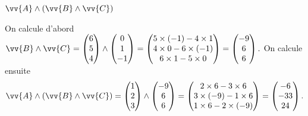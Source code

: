 


\begin{enonce}
$\vv{A}\wedge(\vv{B}\wedge\vv{C})$
\end{enonce}


\begin{corrige}
    On calcule d'abord
	$
    \vv{B}\wedge\vv{C} = 
	\begin{pmatrix}
		6 \\ 5 \\ 4
	\end{pmatrix}\wedge
	\begin{pmatrix}
		0 \\ 1 \\ -1
	\end{pmatrix}
	=
	\begin{pmatrix}
		5\times(-1) - 4\times1 \\
		4\times0 - 6\times(-1)	\\
		6\times1 - 5\times0
	\end{pmatrix}
	=
	\begin{pmatrix}
		-9 \\ 6 \\ 6
	\end{pmatrix}.
	$ 
	On calcule ensuite
    \[
    \vv{A}\wedge(\vv{B}\wedge\vv{C}) =
    \begin{pmatrix}
        1 \\ 2 \\ 3
    \end{pmatrix} \wedge
    \begin{pmatrix}
        -9 \\ 6 \\ 6
    \end{pmatrix}
    = 
	\begin{pmatrix}
		2\times6 - 3\times6 \\
		3\times(-9) - 1\times6\\
		1\times6 - 2\times(-9)
	\end{pmatrix}
	=
	\begin{pmatrix}
		-6 \\ -33 \\ 24
	\end{pmatrix}.
    \]
\end{corrige}

